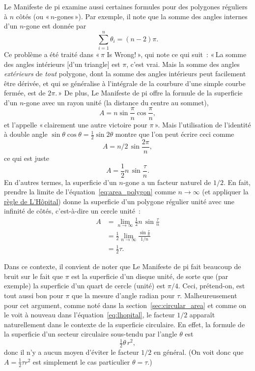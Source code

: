 Le Manifeste de pi examine aussi certaines formules pour des polygones
réguliers à $n$ côtés (ou «\,$n$-gones\,»). Par exemple, il note que la somme des angles internes d'un $n$-gone est donnée par
\[
\sum_{i=1}^n \theta_i=(n-2)\pi.
\]
Ce problème a été traité dans «\,$\pi$ Is Wrong!\,», qui note ce qui suit~: «\,La somme des angles intérieurs [d'un
triangle] est $\pi$, c'est vrai. Mais la somme des angles \emph{extérieurs} de \emph{tout}
polygone, dont la somme des angles intérieurs peut facilement être
dérivée, et qui se généralise à l'intégrale de la courbure d'une
simple courbe fermée, est de $2\pi$.\,» De plus, Le Manifeste de pi offre la formule de la superficie d'un $n$-gone avec un rayon unité (la distance du centre au sommet),
\[ A=n\sin\frac{\pi}{n}\cos\frac{\pi}{n}, \]
et l'appelle «\,clairement\textellipsis{} une autre victoire pour $\pi$\,». Mais l'utilisation de l'identité à double angle $\sin\theta\cos\theta = \frac{1}{2}\sin2\theta$ montre que l'on peut écrire ceci comme
\[ A = n/2\, \sin\frac{2\pi}{n}, \]
ce qui est juste
\begin{equation}
\label{eq:area_polygon}
A = \frac{1}{2} n\, \sin\frac{\tau}{n}.
\end{equation}
En d'autres termes, la superficie d'un $n$-gone a un facteur
naturel de $1/2$. En fait, prendre la limite de l'équation~\eqref{eq:area_polygon} comme $n\rightarrow \infty$ (et appliquer la \href{https://fr.wikipedia.org/wiki/R%C3%A8gle_de_L%27H%C3%B4pital}{règle de L'Hôpital}) donne la superficie d'un polygone régulier unité avec une infinité de côtés, c'est-à-dire un cercle unité~:
\begin{equation}
\label{eq:lhopital}
\begin{split}
A & = \lim_{n\rightarrow\infty} \frac{1}{2} n\, \sin\frac{\tau}{n} \\
  & = \frac{1}{2} \lim_{n\rightarrow\infty} \frac{\sin\frac{\tau}{n}}{1/n} \\
  & = \tfrac{1}{2}\tau.
\end{split}
\end{equation}

Dans ce contexte, il convient de noter que Le Manifeste de pi fait beaucoup de bruit sur le fait que $\pi$ est la superficie d'un disque unité, de sorte que (par exemple) la superficie d'un quart de cercle (unité) est $\pi/4$. Ceci, prétend-on, est tout aussi bon pour $\pi$ que la mesure d'angle radian pour $\tau$. Malheureusement pour cet argument, comme noté dans la section~\ref{sec:circular_area} et comme on le voit à nouveau dans l'équation~\eqref{eq:lhopital}, le facteur $1/2$ apparaît naturellement dans le contexte de la superficie circulaire. En effet, la formule de la superficie d'un secteur circulaire sous-tendu par l'angle $\theta$ est
\[
\tfrac{1}{2}\theta\, r^2,
\]
donc il n'y a aucun moyen d'éviter le facteur $1/2$ en général. (On voit donc que $A =
\frac{1}{2}\tau r^2$ est simplement le cas particulier $\theta = \tau$.)

